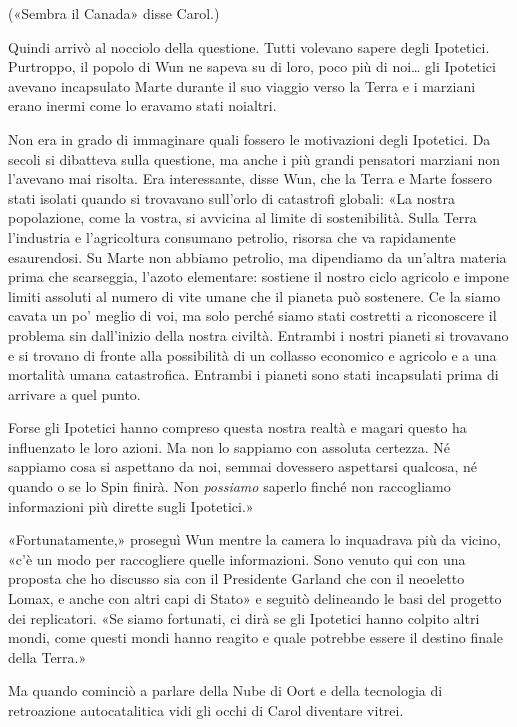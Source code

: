 («Sembra il Canada» disse Carol.)

Quindi arrivò al nocciolo della questione. Tutti volevano sapere degli
Ipotetici. Purtroppo, il popolo di Wun ne sapeva su di loro, poco più di
noi\ldots{} gli Ipotetici avevano incapsulato Marte durante il suo
viaggio verso la Terra e i marziani erano inermi come lo eravamo stati
noialtri.

Non era in grado di immaginare quali fossero le motivazioni degli
Ipotetici. Da secoli si dibatteva sulla questione, ma anche i più grandi
pensatori marziani non l'avevano mai risolta. Era interessante, disse
Wun, che la Terra e Marte fossero stati isolati quando si trovavano
sull'orlo di catastrofi globali: «La nostra popolazione, come la vostra,
si avvicina al limite di sostenibilità. Sulla Terra l'industria e
l'agricoltura consumano petrolio, risorsa che va rapidamente
esaurendosi. Su Marte non abbiamo petrolio, ma dipendiamo da un'altra
materia prima che scarseggia, l'azoto elementare: sostiene il nostro
ciclo agricolo e impone limiti assoluti al numero di vite umane che il
pianeta può sostenere. Ce la siamo cavata un po' meglio di voi, ma solo
perché siamo stati costretti a riconoscere il problema sin dall'inizio
della nostra civiltà. Entrambi i nostri pianeti si trovavano e si
trovano di fronte alla possibilità di un collasso economico e agricolo e
a una mortalità umana catastrofica. Entrambi i pianeti sono stati
incapsulati prima di arrivare a quel punto.

Forse gli Ipotetici hanno compreso questa nostra realtà e magari questo
ha influenzato le loro azioni. Ma non lo sappiamo con assoluta certezza.
Né sappiamo cosa si aspettano da noi, semmai dovessero aspettarsi
qualcosa, né quando o se lo Spin finirà. Non \emph{possiamo} saperlo
finché non raccogliamo informazioni più dirette sugli Ipotetici.»

«Fortunatamente,» proseguì Wun mentre la camera lo inquadrava più da
vicino, «c'è un modo per raccogliere quelle informazioni. Sono venuto
qui con una proposta che ho discusso sia con il Presidente Garland che
con il neoeletto Lomax, e anche con altri capi di Stato» e seguitò
delineando le basi del progetto dei replicatori. «Se siamo fortunati, ci
dirà se gli Ipotetici hanno colpito altri mondi, come questi mondi hanno
reagito e quale potrebbe essere il destino finale della Terra.»

Ma quando cominciò a parlare della Nube di Oort e della tecnologia di
retroazione autocatalitica vidi gli occhi di Carol diventare vitrei.

